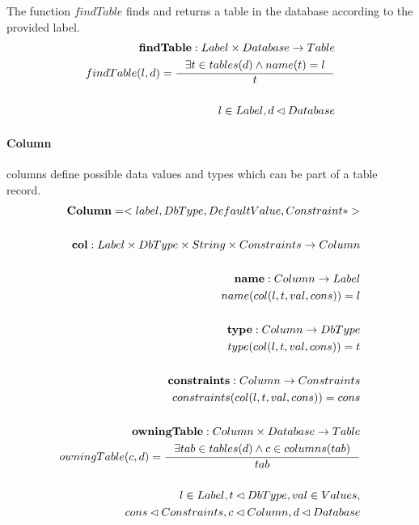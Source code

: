 \documentclass[11pt]{article}
\begin{document}
The function $findTable$ finds and returns a table in the database according to the provided label.
\begin{align*}
	\mathbf{findTable} : Label \times Database \rightarrow Table  \\
	findTable(l, d) = \inference{\exists t \in tables(d) \wedge name(t) = l}{t}  \\ \\
	l \in Label, d \lhd Database
\end{align*}

\paragraph{Column} columns define possible data values and types which can be part of a table record.
\begin{align*}
	\mathbf{Column} = <label, DbType, DefaultValue, Constraint*> \\ \\
	\mathbf{col} : Label \times DbType \times String \times Constraints \rightarrow Column \\ \\
	\mathbf{name} : Column \rightarrow Label  \\
	name(col(l, t, val, cons)) = l  \\ \\
	\mathbf{type} : Column \rightarrow DbType  \\
	type(col(l, t, val, cons)) = t  \\ \\
	\mathbf{constraints} : Column \rightarrow Constraints  \\
	constraints(col(l, t, val, cons)) = cons  \\ \\
	\mathbf{owningTable} : Column \times Database \rightarrow Table  \\
	owningTable(c, d) = \inference{\exists tab \in tables(d) \wedge c \in columns(tab)}{tab} \\ \\
l \in Label, t \lhd DbType, val \in Values,\\ cons \lhd Constraints, c \lhd Column,d \lhd Database
\end{align*}
\end{document}
